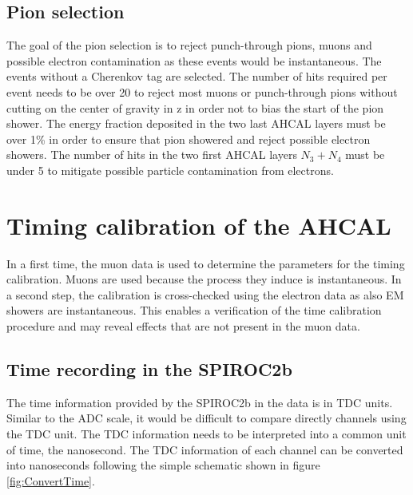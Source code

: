 \subsection{Pion selection}

The goal of the pion selection is to reject punch-through pions, muons and possible electron contamination as these events would be instantaneous. The events without a Cherenkov tag are selected. The number of hits required per event needs to be over 20 to reject most muons or punch-through pions without cutting on the center of gravity in z in order not to bias the start of the pion shower. The energy fraction deposited in the two last AHCAL layers must be over 1\% in order to ensure that pion showered and reject possible electron showers. The number of hits in the two first AHCAL layers $N_3+N_4$ must be under 5 to mitigate possible particle contamination from electrons.

\section{Timing calibration of the AHCAL}

In a first time, the muon data is used to determine the parameters for the timing calibration. Muons are used because the process they induce is instantaneous. In a second step, the calibration is cross-checked using the electron data as also EM showers are instantaneous. This enables a verification of the time calibration procedure and may reveal effects that are not present in the muon data.

\subsection{Time recording in the SPIROC2b}

The time information provided by the SPIROC2b \cite{} in the data is in TDC units. Similar to the ADC scale, it would be difficult to compare directly channels using the TDC unit. The TDC information needs to be interpreted into a common unit of time, the nanosecond. The TDC information of each channel can be converted into nanoseconds following the simple schematic shown in figure \ref{fig:ConvertTime}.

